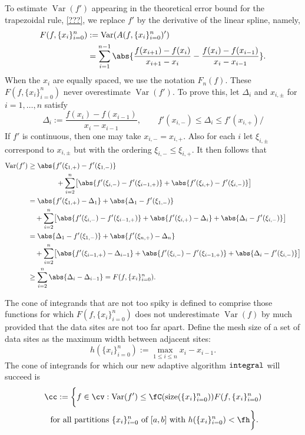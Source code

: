 \documentclass[]{article}
\DeclareMathOperator{\integ}{\texttt{\textup{integral}}}
\DeclareMathOperator{\Var}{Var}
\DeclareMathOperator{\size}{size}
\theoremstyle{definition}
\theoremstyle{remark}
\newcommand{\datasites}{\{x_i\}_{i=0}^n}
\begin{document}
To estimate $\Var(f')$ appearing in the theoretical error bound for the trapezoidal rule, \eqref{???}, we replace $f'$ by the derivative of the linear spline, namely, 
\begin{align*}
F(f,\datasites) &: = \Var(A(f,\datasites)') \\
& = \sum_{i=1}^{n-1} \abs{ \frac{f(x_{i+1})-f(x_{i})}{x_{i+1}-x_{i}} - \frac{f(x_i)-f(x_{i-1})}{x_i-x_{i-1}}}.
\end{align*}
When the $x_i$ are equally spaced, we use the notation $F_n(f)$.  These $F(f,\datasites)$ never overestimate $\Var(f')$.  To prove this, let $\Delta_i$ and $x_{i,\pm}$ for $i=1, \ldots, n$ satisfy
\begin{equation*}
\Delta_i:= \frac{f(x_i)-f(x_{i-1})}{x_i-x_{i-1}}, \qquad f'(x_{i,-}) \le \Delta_i \le f'(x_{i,+})/
\end{equation*}
If $f'$ is continuous, then one may take $x_{i,-}=x_{i,+}$.  Also for each $i$ let $\xi_{i,\pm}$ correspond to $x_{i,\pm}$ but with the ordering $\xi_{i,-} \le \xi_{i,+} $.  It then follows that
\begin{align*}
\Var(f') & \ge \abs{f'(\xi_{1,+}) - f'(\xi_{1,-})}  \\
& \qquad \qquad  + \sum_{i=2}^n \bigl [ \abs{f'(\xi_{i,-}) - f'(\xi_{i-1,+})}+ \abs{f'(\xi_{i,+}) - f'(\xi_{i,-})} \bigr ] \\
& = \abs{f'(\xi_{1,+}) - \Delta_1} + \abs{\Delta_1- f'(\xi_{1,-})}  \\
& \quad  + \sum_{i=2}^n \bigl[ \abs{f'(\xi_{i,-}) - f'(\xi_{i-1,+})}+ \abs{f'(\xi_{i,+}) -\Delta_i} + \abs{\Delta_i- f'(\xi_{i,-})} \bigr] \\
& =  \abs{\Delta_1- f'(\xi_{1,-})} + \abs{f'(\xi_{n,+}) - \Delta_n} \\
& \quad  + \sum_{i=2}^n \bigl[\abs{f'(\xi_{i-1,+}) -\Delta_{i-1}} + \abs{f'(\xi_{i,-}) - f'(\xi_{i-1,+})}+  \abs{\Delta_i- f'(\xi_{i,-})} \bigr] \\
& \ge \sum_{i=2}^n \abs{\Delta_i -\Delta_{i-1}} = F(f,\datasites).
\end{align*}

The cone of integrands that are not too spiky is defined to comprise those functions for which $F(f,\datasites)$ does not underestimate $\Var(f)$ by much provided that the data sites are not too far apart.  Define the mesh size of a set of data sites as the maximum width between adjacent  sites:
\[
h(\datasites):=\max_{1 \le i \le n} x_i-x_{i-1}.
\]
The cone of integrands for which our new adaptive algorithm $\integ$ will succeed is 
\begin{multline}
\cc:=\biggl \{f \in \cv : \Var(f') \le \fC(\size(\datasites)) F(f,\datasites)  \\
\text{ for all partitions } \datasites \text{ of } [a,b] \text{ with } h(\datasites) < \fh \biggr \}.
\end{multline}
\end{document}
